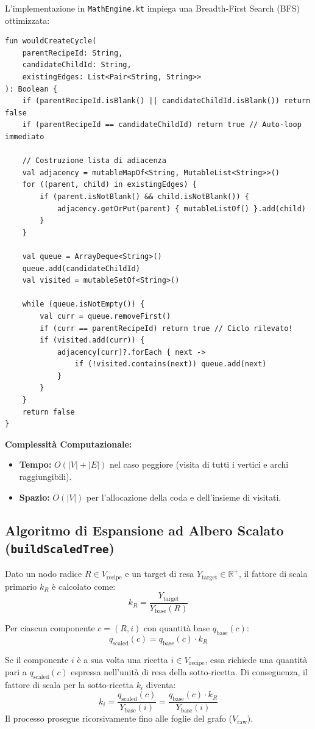 \documentclass[11pt,a4paper,titlepage]{article}
\begin{document}
L'implementazione in \texttt{MathEngine.kt} impiega una Breadth-First Search (BFS) ottimizzata:
\begin{lstlisting}[caption={Algoritmo BFS per la validazione aciclica di nuovi componenti}]
fun wouldCreateCycle(
    parentRecipeId: String,
    candidateChildId: String,
    existingEdges: List<Pair<String, String>>
): Boolean {
    if (parentRecipeId.isBlank() || candidateChildId.isBlank()) return false
    if (parentRecipeId == candidateChildId) return true // Auto-loop immediato

    // Costruzione lista di adiacenza
    val adjacency = mutableMapOf<String, MutableList<String>>()
    for ((parent, child) in existingEdges) {
        if (parent.isNotBlank() && child.isNotBlank()) {
            adjacency.getOrPut(parent) { mutableListOf() }.add(child)
        }
    }

    val queue = ArrayDeque<String>()
    queue.add(candidateChildId)
    val visited = mutableSetOf<String>()

    while (queue.isNotEmpty()) {
        val curr = queue.removeFirst()
        if (curr == parentRecipeId) return true // Ciclo rilevato!
        if (visited.add(curr)) {
            adjacency[curr]?.forEach { next ->
                if (!visited.contains(next)) queue.add(next)
            }
        }
    }
    return false
}
\end{lstlisting}
\textbf{Complessit\`a Computazionale:}
\begin{itemize}
    \item \textbf{Tempo:} $O(|V| + |E|)$ nel caso peggiore (visita di tutti i vertici e archi raggiungibili).
    \item \textbf{Spazio:} $O(|V|)$ per l'allocazione della coda e dell'insieme di visitati.
\end{itemize}

\subsection{Algoritmo di Espansione ad Albero Scalato (\texttt{buildScaledTree})}
Dato un nodo radice $R \in V_{\text{recipe}}$ e un target di resa $Y_{\text{target}} \in \mathbb{R}^+$, il fattore di scala primario $k_R$ \`e calcolato come:
$$k_R = \frac{Y_{\text{target}}}{Y_{\text{base}}(R)}$$

Per ciascun componente $c = (R, i)$ con quantit\`a base $q_{\text{base}}(c)$:
$$q_{\text{scaled}}(c) = q_{\text{base}}(c) \cdot k_R$$

Se il componente $i$ \`e a sua volta una ricetta $i \in V_{\text{recipe}}$, essa richiede una quantit\`a pari a $q_{\text{scaled}}(c)$ espressa nell'unit\`a di resa della sotto-ricetta. Di conseguenza, il fattore di scala per la sotto-ricetta $k_i$ diventa:
$$k_i = \frac{q_{\text{scaled}}(c)}{Y_{\text{base}}(i)} = \frac{q_{\text{base}}(c) \cdot k_R}{Y_{\text{base}}(i)}$$
Il processo prosegue ricorsivamente fino alle foglie del grafo ($V_{\text{raw}}$).
\end{document}
